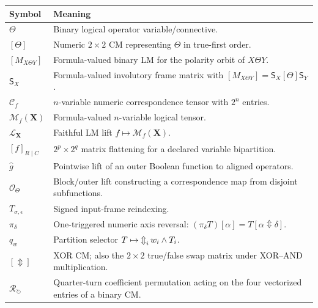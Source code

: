 \documentclass[11pt]{article}
\theoremstyle{definition}
\theoremstyle{remark}
\newcommand{\cC}{\mathcal C}
\newcommand{\cM}{\mathcal M}
\newcommand{\cO}{\mathcal O}
\newcommand{\xor}{\mathbin{\Updownarrow}}
\newcommand{\bigxor}{\mathop{\Updownarrow}\displaylimits}
\begin{document}
\begin{center}\small
\begin{tabular}{p{.25\linewidth}p{.64\linewidth}}
\toprule
Symbol & Meaning\\
\midrule
$\Theta$ & Binary logical operator variable/connective.\\
$[\Theta]$ & Numeric $2\times2$ CM representing $\Theta$ in true-first order.\\
$[M_{X\Theta Y}]$ & Formula-valued binary LM for the polarity orbit of $X\Theta Y$.\\
$\mathsf S_X$ & Formula-valued involutory frame matrix with $[M_{X\Theta Y}]=\mathsf S_X[\Theta]\mathsf S_Y$.\\
$\cC_f$ & $n$-variable numeric correspondence tensor with $2^n$ entries.\\
$\cM_f(\mathbf X)$ & Formula-valued $n$-variable logical tensor.\\
$\mathcal L_{\mathbf X}$ & Faithful LM lift $f\mapsto\cM_f(\mathbf X)$.\\
$[f]_{R\mid C}$ & $2^p\times2^q$ matrix flattening for a declared variable bipartition.\\
$\widehat g$ & Pointwise lift of an outer Boolean function to aligned operators.\\
$\cO_\Theta$ & Block/outer lift constructing a correspondence map from disjoint subfunctions.\\
$T_{\sigma,\epsilon}$ & Signed input-frame reindexing.\\
$\pi_\delta$ & One-triggered numeric axis reversal: $(\pi_\delta T)[\alpha]=T[\alpha\xor\delta]$.\\
$q_w$ & Partition selector $T\mapsto\bigxor_i w_i\land T_i$.\\
$[\Updownarrow]$ & XOR CM; also the $2\times2$ true/false swap matrix under XOR--AND multiplication.\\
$\mathcal R_{\circlearrowright}$ & Quarter-turn coefficient permutation acting on the four vectorized entries of a binary CM.\\
\bottomrule
\end{tabular}
\end{center}
\end{document}
